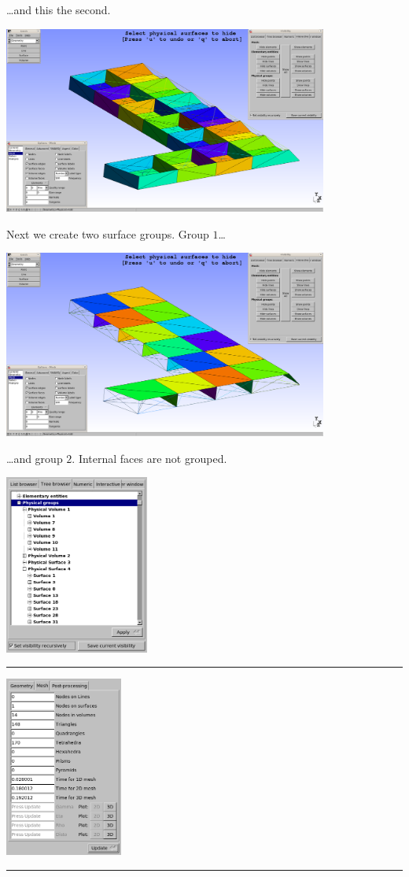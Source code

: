 \begin{frame}
\begin{center}
  \end{center}
  \ldots and this the second.
  \begin{center}
    \includegraphics[width=0.8\textwidth]{./EPS/L/L_surfgroup1}
  \end{center}
  Next we create two surface groups. Group $1$\ldots
  \begin{center}
    \includegraphics[width=0.8\textwidth]{./EPS/L/L_surfgroup2}
  \end{center}
  \ldots and group $2$. Internal faces are not grouped.
  \begin{center}
    \includegraphics[width=0.355\textwidth]{./EPS/L/L_physgroups}\rule{1mm}{0mm}
    \includegraphics[width=0.29\textwidth]{./EPS/L/L_meshstatistics}\rule{1mm}{0mm}

\end{center}
\end{frame}
